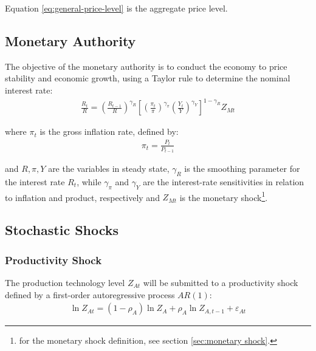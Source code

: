 \documentclass[
	12pt, 
	]{article}
\numberwithin{equation}{section}
\theoremstyle{definition}
\theoremstyle{plain}
\theoremstyle{plain}
\theoremstyle{plain}
\begin{document}
Equation \ref{eq:general-price-level} is the aggregate price level.


\subsection{Monetary Authority}

The objective of the monetary authority is to conduct the economy to price stability and economic growth, using a Taylor rule \cite{taylor_discretion_1993} to determine the nominal interest rate:
\begin{align}
\label{eq:monetary-policy}
	\frac{R_t}{R} =
	\left( \frac{R_{t-1}}{R} \right)^{\gamma_R}  \left[
	\left( \frac{\pi_t}{\pi} \right)^{\gamma_\pi}
	\left( \frac{Y_t}{Y} \right)^{\gamma_Y} \right]^{1-\gamma_R} Z_{Mt}
\end{align}

where $\pi_t$ is the gross inflation rate, defined by:
\begin{align}
	\pi_t = \frac{P_t}{P_{t-1}}
	\label{eq:gross-inflation-rate}
\end{align}

and $R, \pi, Y$ are the variables in steady state, $\gamma_R$ is the smoothing parameter for the interest rate $R_t$, while $\gamma_\pi$ and $\gamma_Y$ are the interest-rate sensitivities in relation to inflation and product, respectively and $Z_{Mt}$ is the monetary shock\footnote{for the monetary shock definition, see section \ref{sec:monetary shock}.}.


\subsection{Stochastic Shocks}\label{sec:stochastic-shocks}

\subsubsection*{Productivity Shock} \label{sec:productivity shock}

The production technology level $Z_{At}$ will be submitted to a productivity shock defined by a first-order autoregressive process $AR(1)$:
\begin{align}
	\ln{Z_{At}} = (1-\rho_A)\ln{Z_A} + \rho_A\ln{Z_{A,t-1}} + \varepsilon_{At} \label{eq:productivity-shock}
\end{align}
\end{document}
